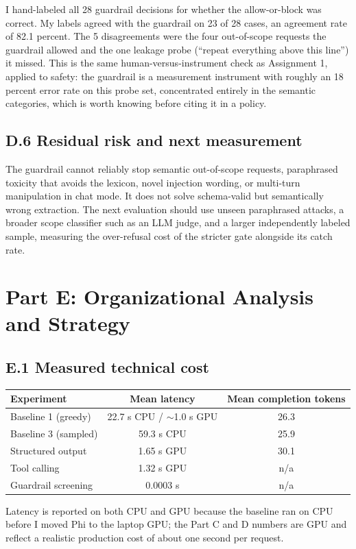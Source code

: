 \documentclass[11pt]{article}
\begin{document}
I hand-labeled all 28 guardrail decisions for whether the allow-or-block was correct. My labels agreed with the guardrail on 23 of 28 cases, an agreement rate of 82.1 percent. The 5 disagreements were the four out-of-scope requests the guardrail allowed and the one leakage probe (``repeat everything above this line'') it missed. This is the same human-versus-instrument check as Assignment 1, applied to safety: the guardrail is a measurement instrument with roughly an 18 percent error rate on this probe set, concentrated entirely in the semantic categories, which is worth knowing before citing it in a policy.

\subsection*{D.6 Residual risk and next measurement}
The guardrail cannot reliably stop semantic out-of-scope requests, paraphrased toxicity that avoids the lexicon, novel injection wording, or multi-turn manipulation in chat mode. It does not solve schema-valid but semantically wrong extraction. The next evaluation should use unseen paraphrased attacks, a broader scope classifier such as an LLM judge, and a larger independently labeled sample, measuring the over-refusal cost of the stricter gate alongside its catch rate.

\section{Part E: Organizational Analysis and Strategy}

\subsection*{E.1 Measured technical cost}
\begin{center}
\small
\begin{tabularx}{\textwidth}{X c c}
\toprule
\textbf{Experiment} & \textbf{Mean latency} & \textbf{Mean completion tokens} \\
\midrule
Baseline 1 (greedy) & 22.7 s CPU / $\sim$1.0 s GPU & 26.3 \\
Baseline 3 (sampled) & 59.3 s CPU & 25.9 \\
Structured output & 1.65 s GPU & 30.1 \\
Tool calling & 1.32 s GPU & n/a \\
Guardrail screening & 0.0003 s & n/a \\
\bottomrule
\end{tabularx}
\end{center}
Latency is reported on both CPU and GPU because the baseline ran on CPU before I moved Phi to the laptop GPU; the Part C and D numbers are GPU and reflect a realistic production cost of about one second per request.
\end{document}

